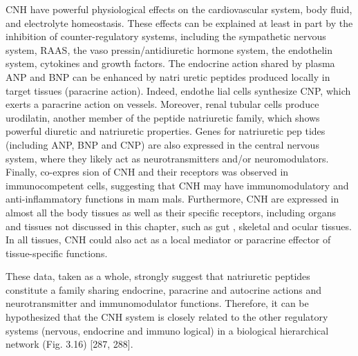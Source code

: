 \documentclass[14pt,a4paper,onecolumn]{extarticle}
\begin{document}
CNH have powerful physiological effects on the cardiovascular system, body fluid, and electrolyte homeostasis. These effects can be explained at least in part by the inhibition of counter-regulatory systems, including the sympathetic nervous system, RAAS, the vaso pressin/antidiuretic hormone system, the endothelin system, cytokines and growth factors.  The endocrine action shared by plasma ANP and BNP can be enhanced by natri uretic peptides produced locally in target tissues (paracrine action). Indeed, endothe lial cells synthesize CNP, which exerts a paracrine action on vessels. Moreover, renal tubular cells produce urodilatin, another member of the peptide natriuretic family, which shows powerful diuretic and natriuretic properties. Genes for natriuretic pep tides (including ANP, BNP and CNP) are also expressed in the central nervous system, where they likely act as neurotransmitters and/or neuromodulators. Finally, co-expres sion of CNH and their receptors was observed in immunocompetent cells, suggesting that CNH may have immunomodulatory and anti-inflammatory functions in mam mals. Furthermore, CNH are expressed in almost all the body tissues as well as their specific receptors, including organs and tissues not discussed in this chapter, such as gut \citep{285}, skeletal \citep{106} and ocular \citep{286} tissues. In all tissues, CNH could also act as a local mediator or paracrine effector of tissue-specific functions.

These data, taken as a whole, strongly suggest that natriuretic peptides constitute a family sharing endocrine, paracrine and autocrine actions and neurotransmitter and immunomodulator functions. Therefore, it can be hypothesized that the CNH system is closely related to the other regulatory systems (nervous, endocrine and immuno logical) in a biological hierarchical network (Fig. 3.16) [287, 288].


\end{document}
